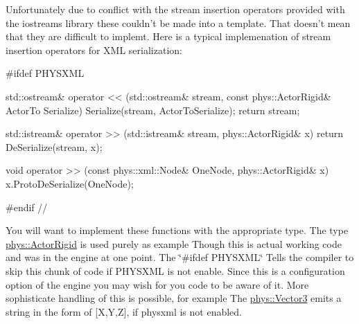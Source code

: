 Unfortunately due to conflict with the stream insertion operators provided with the iostreams library these couldn't be made into a template. That doesn't mean that they are difficult to implemt. Here is a typical implemenation of stream insertion operators for XML serialization: 
\begin{DoxyCode}
 #ifdef PHYSXML

 std::ostream& operator << (std::ostream& stream, const phys::ActorRigid& ActorTo
      Serialize)
 {
     Serialize(stream, ActorToSerialize);
     return stream;
 }

 std::istream& operator >> (std::istream& stream, phys::ActorRigid& x)
     { return DeSerialize(stream, x); }

 void operator >> (const phys::xml::Node& OneNode, phys::ActorRigid& x)
     { x.ProtoDeSerialize(OneNode); }

 #endif  // \physxml
\end{DoxyCode}
 You will want to implement these functions with the appropriate type. The type \hyperlink{classphys_1_1ActorRigid}{phys::ActorRigid} is used purely as example Though this is actual working code and was in the engine at one point. The \char`\"{}\#ifdef PHYSXML\char`\"{} Tells the compiler to skip this chunk of code if PHYSXML is not enable. Since this is a configuration option of the engine you may wish for you code to be aware of it. More sophisticate handling of this is possible, for example The \hyperlink{classphys_1_1Vector3}{phys::Vector3} emits a string in the form of \mbox{[}X,Y,Z\mbox{]}, if physxml is not enabled. \par
 \par
